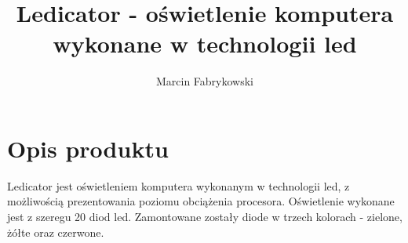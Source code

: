 \documentclass[a4paper,12pt]{article}
\author{Marcin Fabrykowski}
\title{Ledicator - oświetlenie komputera wykonane w technologii led}
\begin{document}
\maketitle
\newpage
\tableofcontents
\newpage
\section{Opis produktu}
Ledicator jest oświetleniem komputera wykonanym w technologii led, z możliwością prezentowania poziomu obciążenia procesora.
Oświetlenie wykonane jest z szeregu 20 diod led.
Zamontowane zostały diode w trzech kolorach - zielone, żółte oraz czerwone.
\end{document}
